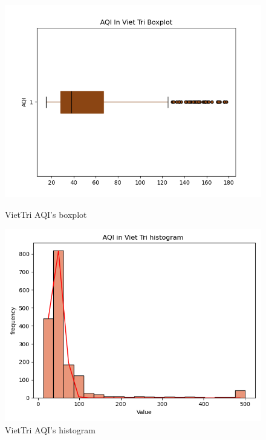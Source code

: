 \documentclass[conference]{IEEEtran}
\begin{document}
\begin{figure}[H]
    \centering
    \begin{minipage}{0.23\textwidth}
        \centering
        \includegraphics[width=1\textwidth]{bibliography/figure/Analysis-Dataset/BoxplotVietTri.png}
        \caption{VietTri AQI's boxplot}
        \label{fig:1}
    \end{minipage}
    \hfill
    \begin{minipage}{0.23\textwidth}
        \centering
        \includegraphics[width=1\textwidth]{bibliography/figure/Analysis-Dataset/histogramVietTri.png}
        \caption{VietTri AQI's histogram}
        \label{fig:2}
    \end{minipage}
\end{figure}
\end{document}
